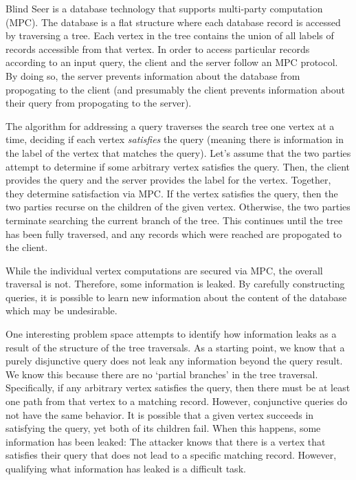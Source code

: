 \documentclass{article}
\begin{document}
Blind Seer is a database technology that supports multi-party
computation (MPC).
%
The database is a flat structure where each database record is
accessed by traversing a tree.
%
Each vertex in the tree contains the union of all labels of records
accessible from that vertex.
%
In order to access particular records according to an input query, the
client and the server follow an MPC protocol. By doing so, the server
prevents information about the database from propogating to the client
(and presumably the client prevents information about their query from
propogating to the server).

The algorithm for addressing a query traverses the search tree one
vertex at a time, deciding if each vertex \emph{satisfies} the query
(meaning there is information in the label of the vertex that matches
the query).
%
Let's assume that the two parties attempt to determine if some
arbitrary vertex satisfies the query.
%
Then, the client provides the query and the server provides the label for
the vertex. Together, they determine satisfaction via MPC.
%
If the vertex satisfies the query, then the two parties recurse on the
children of the given vertex.
%
Otherwise, the two parties terminate searching the current branch of
the tree.
%
This continues until the tree has been fully traversed, and any
records which were reached are propogated to the
client.

While the individual vertex computations are secured via MPC, the
overall traversal is not.
%
Therefore, some information is leaked.
%
By carefully constructing queries, it is possible to learn new
information about the content of the database which may be
undesirable.
%

One interesting problem space attempts to identify how information
leaks as a result of the structure of the tree traversals.
%
As a starting point, we know that a purely disjunctive query does not
leak any information beyond the query result. We know this because
there are no `partial branches' in the tree traversal.
%
Specifically, if any arbitrary vertex satisfies the query, then there
must be at least one path from that vertex to a matching record.
%
However, conjunctive queries do not have the same behavior. It is
possible that a given vertex succeeds in satisfying the query, yet
both of its children fail.
%
When this happens, some information has been leaked: The attacker
knows that there is a vertex that satisfies their query that does not
lead to a specific matching record.
%
However, qualifying what information has leaked is a difficult task.
\end{document}
